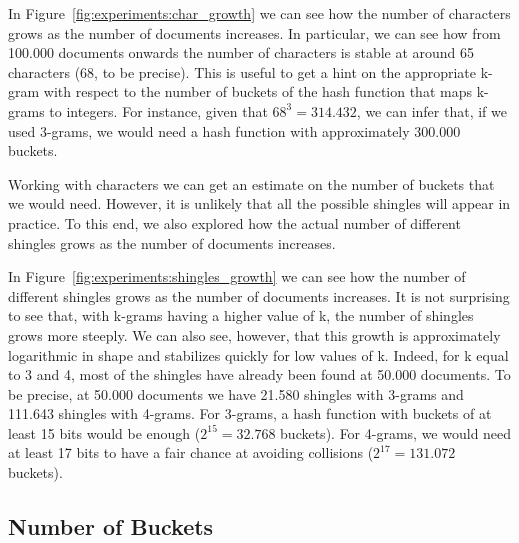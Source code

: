 \documentclass[runningheads]{llncs}
\begin{document}
In Figure~\ref{fig:experiments:char_growth} we can see how the number of characters grows as the number of documents increases. In particular, we can see how from 100.000 documents onwards the number of characters is stable at around 65 characters (68, to be precise). This is useful to get a hint on the appropriate k-gram with respect to the number of buckets of the hash function that maps k-grams to integers. For instance, given that $68^3 = 314.432$, we can infer that, if we used 3-grams, we would need a hash function with approximately 300.000 buckets.

Working with characters we can get an estimate on the number of buckets that we would need. However, it is unlikely that all the possible shingles will appear in practice. To this end, we also explored how the actual number of different shingles grows as the number of documents increases.

In Figure~\ref{fig:experiments:shingles_growth} we can see how the number of different shingles grows as the number of documents increases. It is not surprising to see that, with k-grams having a higher value of k, the number of shingles grows more steeply. We can also see, however, that this growth is approximately logarithmic in shape and stabilizes quickly for low values of k. Indeed, for k equal to 3 and 4, most of the shingles have already been found at 50.000 documents. To be precise, at 50.000 documents we have 21.580 shingles with 3-grams and 111.643 shingles with 4-grams. For 3-grams, a hash function with buckets of at least 15 bits would be enough ($2^{15} = 32.768$ buckets). For 4-grams, we would need at least 17 bits to have a fair chance at avoiding collisions ($2^{17} = 131.072$ buckets).  


\subsection{Number of Buckets}
\label{subsec:experiments:buckets}
\end{document}
